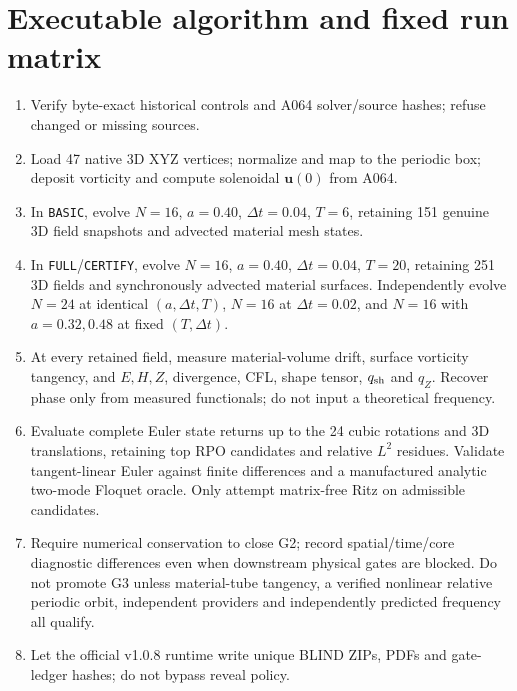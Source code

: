 \documentclass[11pt,a4paper]{article}
\begin{document}
\section{Executable algorithm and fixed run matrix}
\begin{enumerate}
\item Verify byte-exact historical controls and A064 solver/source hashes; refuse changed or missing sources.
\item Load 47 native 3D XYZ vertices; normalize and map to the periodic box; deposit vorticity and compute solenoidal $\mathbf u(0)$ from A064.
\item In \texttt{BASIC}, evolve $N=16$, $a=0.40$, $\Delta t=0.04$, $T=6$, retaining 151 genuine 3D field snapshots and advected material mesh states.
\item In \texttt{FULL}/\texttt{CERTIFY}, evolve $N=16$, $a=0.40$, $\Delta t=0.04$, $T=20$, retaining 251 3D fields and synchronously advected material surfaces. Independently evolve $N=24$ at identical $(a,\Delta t,T)$, $N=16$ at $\Delta t=0.02$, and $N=16$ with $a=0.32,0.48$ at fixed $(T,\Delta t)$.
\item At every retained field, measure material-volume drift, surface vorticity tangency, and $E,H,Z$, divergence, CFL, shape tensor, $q_{\rm sh}$ and $q_Z$. Recover phase only from measured functionals; do not input a theoretical frequency.
\item Evaluate complete Euler state returns up to the 24 cubic rotations and 3D translations, retaining top RPO candidates and relative $L^2$ residues. Validate tangent-linear Euler against finite differences and a manufactured analytic two-mode Floquet oracle. Only attempt matrix-free Ritz on admissible candidates.\item Require numerical conservation to close G2; record spatial/time/core diagnostic differences even when downstream physical gates are blocked. Do not promote G3 unless material-tube tangency, a verified nonlinear relative periodic orbit, independent providers and independently predicted frequency all qualify.
\item Let the official v1.0.8 runtime write unique BLIND ZIPs, PDFs and gate-ledger hashes; do not bypass reveal policy.\end{enumerate}

\end{document}
